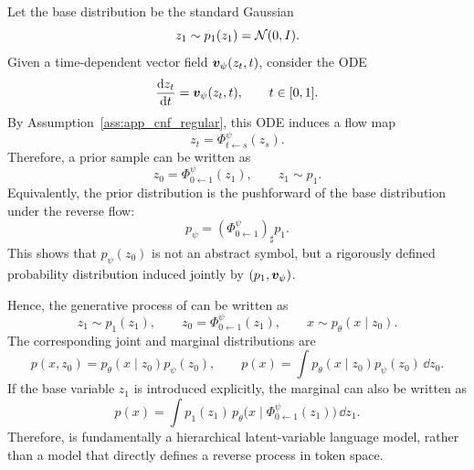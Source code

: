 Let the base distribution be the standard Gaussian
\begin{equation}
z_1\sim p_1(z_1)=\mathcal{N}(0,I).
\label{eq:app_base_dist}
\end{equation}
Given a time-dependent vector field $\bm{v}_{\psi}(z_t,t)$, consider the ODE
\begin{equation}
\frac{\mathrm{d} z_t}{\mathrm{d} t}=\bm{v}_{\psi}(z_t,t),
\qquad t\in[0,1].
\label{eq:app_ode_def}
\end{equation}
By Assumption~\ref{ass:app_cnf_regular}, this ODE induces a flow map
\begin{equation}
z_t=\Phi^{\psi}_{t\leftarrow s}(z_s).
\label{eq:app_flow_map}
\end{equation}
Therefore, a prior sample can be written as
\begin{equation}
z_0=\Phi^{\psi}_{0\leftarrow 1}(z_1),
\qquad z_1\sim p_1.
\label{eq:app_reverse_flow_sampling}
\end{equation}
Equivalently, the prior distribution is the pushforward of the base distribution under the reverse flow:
\begin{equation}
p_{\psi}=(\Phi^{\psi}_{0\leftarrow 1})_{\sharp}p_1.
\label{eq:app_prior_pushforward}
\end{equation}
This shows that $p_{\psi}(z_0)$ is not an abstract symbol, but a rigorously defined probability distribution induced jointly by $(p_1,\bm{v}_{\psi})$.

Hence, the generative process of \method can be written as
\begin{equation}
z_1\sim p_1(z_1),
\qquad
z_0=\Phi^{\psi}_{0\leftarrow 1}(z_1),
\qquad
x\sim p_{\theta}(x\mid z_0).
\label{eq:app_generative_process}
\end{equation}
The corresponding joint and marginal distributions are
\begin{equation}
p(x,z_0)=p_{\theta}(x\mid z_0)p_{\psi}(z_0),
\qquad
p(x)=\int p_{\theta}(x\mid z_0)p_{\psi}(z_0)\,\dd z_0.
\label{eq:app_joint_and_marginal}
\end{equation}
If the base variable $z_1$ is introduced explicitly, the marginal can also be written as
\begin{equation}
p(x)=\int p_1(z_1)\,p_{\theta}\bigl(x\mid \Phi^{\psi}_{0\leftarrow 1}(z_1)\bigr)\,\dd z_1.
\label{eq:app_marginal_via_z1}
\end{equation}
Therefore, \method is fundamentally a hierarchical latent-variable language model, rather than a model that directly defines a reverse process in token space.


